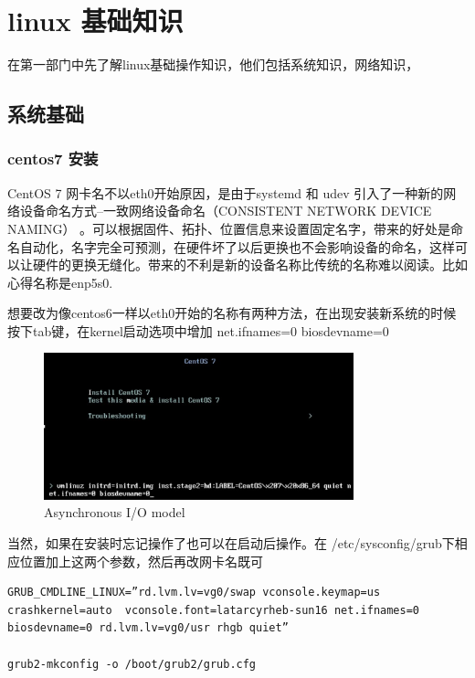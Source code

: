 \part{linux 基础知识}

在第一部门中先了解linux基础操作知识，他们包括系统知识，网络知识，


\chapter{系统基础}

\section{centos7 安装}

CentOS 7 网卡名不以eth0开始原因，是由于systemd 和 udev 引入了一种新的网络设备命名方式–一致网络设备命名（CONSISTENT NETWORK DEVICE NAMING） 。可以根据固件、拓扑、位置信息来设置固定名字，带来的好处是命名自动化，名字完全可预测，在硬件坏了以后更换也不会影响设备的命名，这样可以让硬件的更换无缝化。带来的不利是新的设备名称比传统的名称难以阅读。比如心得名称是enp5s0.

想要改为像centos6一样以eth0开始的名称有两种方法，在出现安装新系统的时候按下tab键，在kernel启动选项中增加 net.ifnames=0 biosdevname=0 


\begin{figure}[!ht]
    \centering    
     \caption{\label{Fig:async} Asynchronous I/O model}
    \includegraphics[width=0.8\textwidth]{./images/centos-bios.png}  
\end{figure}

当然，如果在安装时忘记操作了也可以在启动后操作。在 /etc/sysconfig/grub下相应位置加上这两个参数，然后再改网卡名既可

\begin{lstlisting}
GRUB_CMDLINE_LINUX=”rd.lvm.lv=vg0/swap vconsole.keymap=us crashkernel=auto  vconsole.font=latarcyrheb-sun16 net.ifnames=0 biosdevname=0 rd.lvm.lv=vg0/usr rhgb quiet”

grub2-mkconfig -o /boot/grub2/grub.cfg

\end{lstlisting}

